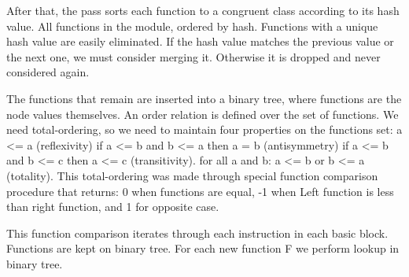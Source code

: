 After that, the pass sorts each function to a congruent class according to
its hash value.
All functions in the module, ordered by hash. Functions with a unique
hash value are easily eliminated.
If the hash value matches the previous value or the next one, we must
consider merging it. Otherwise it is dropped and never considered again.

The functions that remain are inserted into a binary tree, where functions are
the node values themselves.
An order relation is defined over the set of functions.
We need total-ordering, so we need to maintain four properties on the functions set:
 a <= a (reflexivity)
 if a <= b and b <= a then a = b (antisymmetry)
 if a <= b and b <= c then a <= c (transitivity).
 for all a and b: a <= b or b <= a (totality).
This total-ordering was made through special function comparison procedure that
returns:
 0 when functions are equal,
-1 when Left function is less than right function, and
 1 for opposite case.

This function comparison iterates through each instruction in each basic block.
Functions are kept on binary tree. For each new function F we perform
lookup in binary tree.




